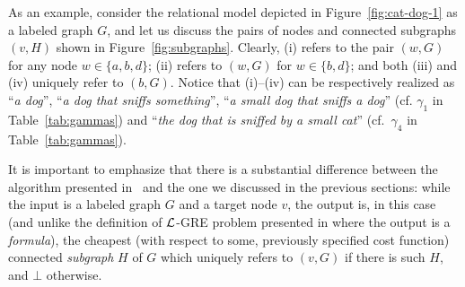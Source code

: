As an example, consider the relational model depicted in
Figure~\ref{fig:cat-dog-1} as a labeled graph $G$, and let us
discuss the pairs of nodes and connected subgraphs $(v,H)$ shown in
Figure~\ref{fig:subgraphs}. Clearly, (i) refers to the pair $(w,G)$
for any node $w\in\{a,b,d\}$; (ii) refers to $(w,G)$ for
$w\in\{b,d\}$; and both (iii) and (iv) uniquely refer to $(b,G)$. Notice
that (i)--(iv) can be respectively realized as ``{\em a dog}'',
``{\em a dog that sniffs something}'', ``{\em a small dog that
sniffs a dog}'' (cf. $\gamma_1$ in Table~\ref{tab:gammas}) %
and ``{\em the dog that is sniffed by a small cat}'' (cf.~$\gamma_4$ in
Table~\ref{tab:gammas}).






It is important to emphasize that there is a substantial difference
between the algorithm presented in~\cite{Krahmer2003} and the one we discussed
in the previous sections:
%
%
while the input is a labeled graph $G$ and a target node $v$, the
output is, in this case (and unlike the definition of $\mathcal{L}$-GRE problem
presented in  where the output is a {\em formula}), the cheapest (with
respect to some, previously specified cost function) connected
{\em subgraph} $H$ of $G$ which uniquely refers to $(v,G)$ if there is
such $H$, and $\bot$ otherwise.


